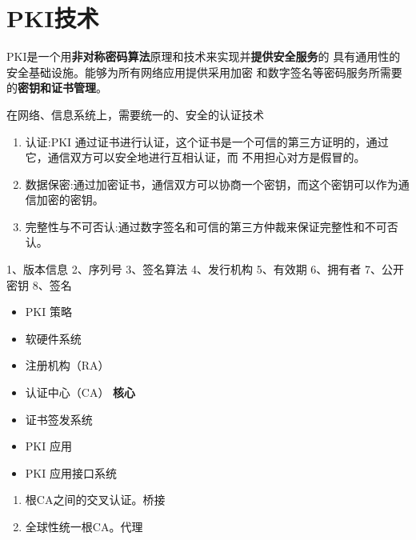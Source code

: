 \chapter{PKI技术}
PKI是一个用\textbf{非对称密码算法}原理和技术来实现并\textbf{提供安全服务}的
具有通用性的安全基础设施。能够为所有网络应用提供采用加密
和数字签名等密码服务所需要的\textbf{密钥和证书管理}。

在网络、信息系统上，需要统一的、安全的认证技术

\begin{enumerate}
	\item 认证:PKI 通过证书进行认证，这个证书是一个可信的第三方证明的，通过它，通信双方可以安全地进行互相认证，而
	不用担心对方是假冒的。
	\item 数据保密:通过加密证书，通信双方可以协商一个密钥，而这个密钥可以作为通信加密的密钥。
	\item 完整性与不可否认:通过数字签名和可信的第三方仲裁来保证完整性和不可否认。
\end{enumerate}
1、版本信息 2、序列号 3、签名算法 4、发行机构 5、有效期 6、拥有者 7、公开密钥 8、签名
\begin{itemize}
	\item PKI 策略
	\item 软硬件系统 
	\item 注册机构（RA） 
	\item 认证中心（CA） \textbf{核心}
	\item 证书签发系统 
	\item PKI 应用 
	\item PKI 应用接口系统
\end{itemize}

\begin{enumerate}
	\item 根CA之间的交叉认证。桥接
	\item 全球性统一根CA。代理
\end{enumerate}